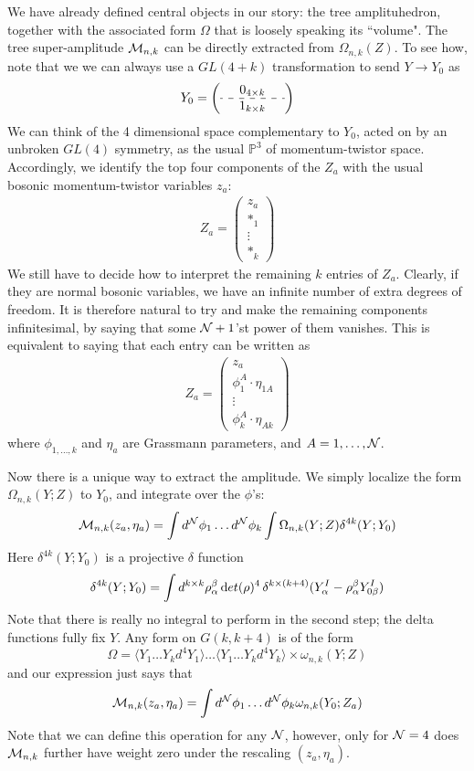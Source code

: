 \documentclass[12pt,nohyper,twosided]{JHEP3}
\newcommand{\be}{\begin{eqnarray}}
\newcommand{\ee}{\end{eqnarray}}
\begin{document}
We have already defined central objects in our story: the
tree amplituhedron, together with the associated form $\Omega$
that is loosely speaking its ``volume". The
tree super-amplitude ${\cal M}_{n,k}$ can be
directly extracted from $\Omega_{n,k}(Z)$. To see how, note that
we we can always use a $GL(4 +k)$ transformation to send $Y \to Y_0$
as \be Y_0 = \left(\begin{array}{ccc} & 0_{4 \times k} & \\
\hdashline & 1_{k \times k} & \end{array} \right) \ee We can think
of the 4 dimensional space complementary to $Y_0$, acted on by an
unbroken $GL(4)$ symmetry, as the usual $\mathbb{P}^3$ of
momentum-twistor space. Accordingly, we identify the top four
components of the $Z_a$ with the usual bosonic momentum-twistor
variables $z_a$: \be Z_a = \left(\begin{array}{c} z_a \\ *_1 \\
\vdots \\ *_k
\end{array}\right) \ee We still have to decide how to interpret the
remaining $k$ entries of $Z_a$. Clearly, if they are normal bosonic
variables, we have an infinite number of extra degrees of freedom.
It is therefore natural to try and make the remaining components
infinitesimal, by saying that some ${\cal N} + 1$'st power of them
vanishes. This is equivalent to saying that each entry can be
written as \be Z_a = \left(\begin{array}{c} z_a \\ \phi^A_1 \cdot
\eta_{1 A} \\ \vdots \\ \phi^A_k \cdot \eta_{A k} \end{array}\right)
\ee where $\phi_{1,\dots,k}$ and $\eta_a$ are Grassmann parameters,
and $A = 1, \dots, {\cal N}$.

Now there is a unique way to extract the amplitude. We simply
localize the form $\Omega_{n,k}(Y;Z)$ to $Y_0$, and integrate over the
$\phi$'s: \be {\cal M}_{n,k}(z_a,\eta_a) = \int d^{\cal N} \phi_1 \dots
d^{\cal N} \phi_k \int \Omega_{n,k}(Y;Z)  \delta^{4k}(Y;Y_0)
\label{super}\ee Here $\delta^{4k}(Y;Y_0)$ is a projective $\delta$
function \be \delta^{4k}(Y;Y_0) = \int d^{k \times k}
\rho_\alpha^\beta \, {\rm det}(\rho)^4 \, \delta^{k \times
(k+4)}(Y_\alpha^I - \rho_{\alpha}^\beta Y_{0 \beta}^I) \ee Note that
there is really no integral to perform in the second step; the delta
functions fully fix $Y$. Any form on $G(k, k+4)$ is of the form
\begin{equation}
\Omega =  \langle Y_1 \dots Y_k d^4 Y_1 \rangle \dots \langle Y_1
\dots Y_k d^4 Y_k \rangle \times \omega_{n,k}(Y;Z)
\end{equation}
and our expression just says that \be {\cal M}_{n,k}(z_a,\eta_a) = \int
d^{\cal N} \phi_1 \dots d^{\cal N} \phi_k  \omega_{n,k}(Y_0;Z_a) \ee
Note that we can define this operation for any ${\cal N}$, however,
only for ${\cal N} = 4$ does ${\cal M}_{n,k}$ further have weight zero under the
rescaling $(z_a,\eta_a)$.
\end{document}

